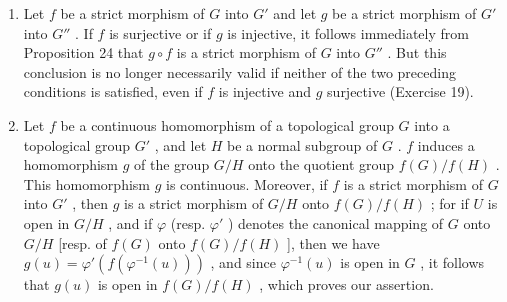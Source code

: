 \begin{enumerate}
\def\labelenumi{\arabic{enumi})}
\setcounter{enumi}{1}
\item
  Let \(f\) be a strict morphism of \(G\) into \(G'\) and let \(g\) be a strict morphism of \(G'\) into \(G''\) . If \(f\) is surjective or if \(g\) is injective, it follows immediately from Proposition 24 that \(g \circ f\) is a strict morphism of \(G\) into \(G''\) . But this conclusion is no longer necessarily valid if neither of the two preceding conditions is satisfied, even if \(f\) is injective and \(g\) surjective (Exercise 19).
\item
  Let \(f\) be a continuous homomorphism of a topological group \(G\) into a topological group \(G'\) , and let \(H\) be a normal subgroup of \(G\) . \(f\) induces a homomorphism \(g\) of the group \(G / H\) onto the quotient group \(f(G) / f(H)\) . This homomorphism \(g\) is continuous. Moreover, if \(f\) is a strict morphism of \(G\) into \(G'\) , then \(g\) is a strict morphism of \(G / H\) onto \(f(G) / f(H)\) ; for if \(U\) is open in \(G / H\) , and if \(\varphi\) (resp. \(\varphi'\) ) denotes the canonical mapping of \(G\) onto \(G / H\) {[}resp. of \(f(G)\) onto \(f(G) / f(H)\) {]}, then we have \(g(u) = \varphi'(f(\varphi^{-1}(u)))\) , and since \(\varphi^{-1}(u)\) is open in \(G\) , it follows that \(g(u)\) is open in \(f(G) / f(H)\) , which proves our assertion.
\end{enumerate}

